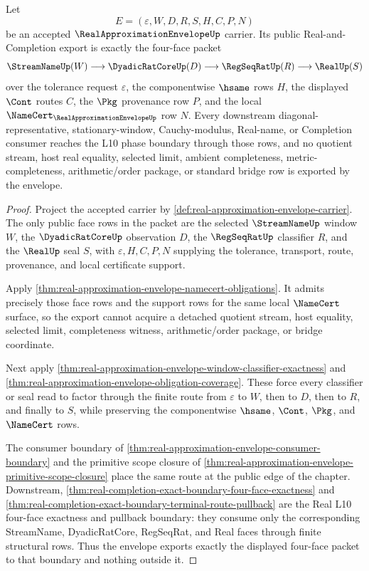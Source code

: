\begin{theorem}
\label{thm:real-approximation-envelope-four-face-public-export}
Let
$$
E=(\varepsilon,W,D,R,S,H,C,P,N)
$$
be an accepted $\RealApproximationEnvelopeUp$ carrier. Its public Real-and-Completion export is exactly the four-face packet
$$
\StreamNameUp(W) \longrightarrow \DyadicRatCoreUp(D) \longrightarrow \RegSeqRatUp(R) \longrightarrow \RealUp(S)
$$
over the tolerance request $\varepsilon$, the componentwise $\hsame$ rows $H$, the displayed $\Cont$ routes $C$, the $\Pkg$ provenance row $P$, and the local $\NameCert_{\RealApproximationEnvelopeUp}$ row $N$. Every downstream diagonal-representative, stationary-window, Cauchy-modulus, Real-name, or Completion consumer reaches the L10 phase boundary through those rows, and no quotient stream, host real equality, selected limit, ambient completeness, metric-completeness, arithmetic/order package, or standard bridge row is exported by the envelope.
\end{theorem}
\begin{proof}
Project the accepted carrier by \autoref{def:real-approximation-envelope-carrier}. The only public face rows in the packet are the selected $\StreamNameUp$ window $W$, the $\DyadicRatCoreUp$ observation $D$, the $\RegSeqRatUp$ classifier $R$, and the $\RealUp$ seal $S$, with $\varepsilon,H,C,P,N$ supplying the tolerance, transport, route, provenance, and local certificate support.

Apply \autoref{thm:real-approximation-envelope-namecert-obligations}. It admits precisely those face rows and the support rows for the same local $\NameCert$ surface, so the export cannot acquire a detached quotient stream, host equality, selected limit, completeness witness, arithmetic/order package, or bridge coordinate.

Next apply \autoref{thm:real-approximation-envelope-window-classifier-exactness} and \autoref{thm:real-approximation-envelope-obligation-coverage}. These force every classifier or seal read to factor through the finite route from $\varepsilon$ to $W$, then to $D$, then to $R$, and finally to $S$, while preserving the componentwise $\hsame$, $\Cont$, $\Pkg$, and $\NameCert$ rows.

The consumer boundary of \autoref{thm:real-approximation-envelope-consumer-boundary} and the primitive scope closure of \autoref{thm:real-approximation-envelope-primitive-scope-closure} place the same route at the public edge of the chapter. Downstream, \autoref{thm:real-completion-exact-boundary-four-face-exactness} and \autoref{thm:real-completion-exact-boundary-terminal-route-pullback} are the Real L10 four-face exactness and pullback boundary: they consume only the corresponding StreamName, DyadicRatCore, RegSeqRat, and Real faces through finite structural rows. Thus the envelope exports exactly the displayed four-face packet to that boundary and nothing outside it.
\end{proof}

